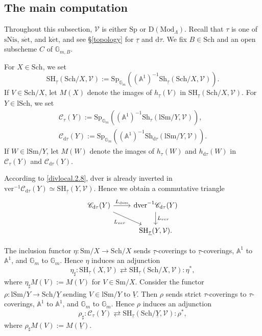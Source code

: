 \documentclass[10pt]{amsart}
\theoremstyle{definition}
\theoremstyle{remark}
\numberwithin{equation}{subsection}
\newcommand{\A}{\mathbb{A}}
\newcommand{\G}{\mathbb{G}}
\newcommand{\cV}{\mathcal{V}}
\newcommand{\sC}{\mathscr{C}}
\newcommand{\ul}{\underline}
\newcommand{\Spt}{\mathrm{Sp}}
\newcommand{\Sm}{\mathrm{Sm}}
\newcommand{\SH}{\mathrm{SH}}
\newcommand{\DLambda}{\mathrm{D}(\mathrm{Mod}_{\Lambda})}
\newcommand{\Sch}{\mathrm{Sch}}
\newcommand{\lSch}{\mathrm{lSch}}
\newcommand{\lSm}{\mathrm{lSm}}
\newcommand{\infShv}{\mathrm{Sh}}
\newcommand{\Stab}{\mathrm{Sp}}
\newcommand{\ver}{\mathrm{ver}}
\newcommand{\dver}{\mathrm{dver}}
\newcommand{\dtau}{\mathrm{d}\tau}
\newcommand{\sNis}{\mathrm{sNis}}
\newcommand{\ketale}{\mathrm{k\acute{e}t}}
\newcommand{\setale}{\mathrm{s\acute{e}t}}
\begin{document}
\subsection{The main computation}



Throughout this subsection, $\cV$ is either $\Spt$ or $\DLambda$.
Recall that $\tau$ is one of $\sNis$, $\setale$, and $\ketale$,
and see \S \ref{topology} for $\ul{\tau}$ and $\dtau$.
We fix $B\in \Sch$ and an open subscheme $C$ of $\G_{m,B}$.

For $X\in \Sch$, we set
\[
\SH_{\ul{\tau}}(\Sch/X,\cV):=\Stab_{\G_m}((\A^1)^{-1}\infShv_{\ul{\tau}}(\Sch/X,\cV)).
\]
If $V\in \Sch/X$, let $M(X)$ denote the images of $h_{\ul{\tau}}(V)$ in $\SH_{\ul{\tau}}(\Sch/X,\cV)$.
For $Y\in \lSch$, we set
\begin{gather*}
\sC_{\tau}(Y):=\Stab_{\G_m}((\A^1)^{-1}\infShv_{\tau}(\lSm/Y,\cV)),
\\
\sC_{\dtau}(Y):=\Stab_{\G_m}((\A^1)^{-1}\infShv_{\dtau}(\lSm/Y,\cV)).
\end{gather*}
If $W\in \lSm/Y$, let $M(W)$ denote the images of $h_{\tau}(W)$ and $h_{\dtau}(W)$ in $\sC_\tau(Y)$ and $\sC_{\dtau}(Y)$.

According to \eqref{divlocal.2.8}, $\dver$ is already inverted in $\ver^{-1}\sC_{\dtau}(Y)\simeq \SH_{\ul{\tau}}(Y,\cV)$.
Hence we obtain a commutative triangle
\begin{equation}
\begin{tikzcd}
\sC_{\dtau }(Y)\ar[r,"L_{\dver}"]\ar[rd,"L_{ver}"']
&
\dver^{-1}\sC_{\dtau}(Y)\ar[d,"L_{ver}"]
\\
&
\SH_{\ul{\tau}}(Y,\cV).
\end{tikzcd}
\end{equation}

The inclusion functor $\eta\colon \Sm/X\to \Sch/X$ sends $\ul{\tau}$-coverings to $\ul{\tau}$-coverings, $\A^1$ to $\A^1$, and $\G_m$ to $\G_m$.
Hence $\eta$ induces an adjunction
\begin{equation}
\eta_\sharp :
\SH_{\ul{\tau}}(X,\cV) \rightleftarrows \SH_{\ul{\tau}}(\Sch/X,\cV)
: \eta^*,
\end{equation}
where $\eta_\sharp M(V):=M(V)$ for $V\in \Sm/X$.
Consider the functor $\rho\colon \lSm/Y\to \Sch/\ul{Y}$ sending $V\in \lSm/Y$ to $\ul{V}$.
Then $\rho$ sends strict $\tau$-coverings to $\tau$-coverings, $\A^1$ to $\A^1$, and $\G_m$ to $\G_m$.
Hence $\rho$ induces an adjunction
\begin{equation}
\rho_\sharp :
\sC_{\tau}(Y)\rightleftarrows \SH_{\ul{\tau}}(\Sch/\ul{Y},\cV)
: \rho^*,
\end{equation}
where $\rho_\sharp M(V):=M(\ul{V})$.
\end{document}
